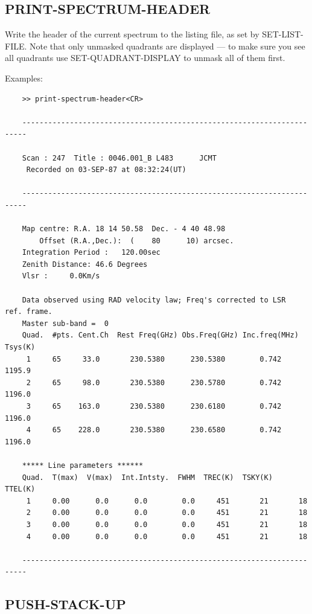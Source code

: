 \documentclass[11pt,twoside]{report}
\begin{document}
\subsection{PRINT-SPECTRUM-HEADER} 

Write the header of the current spectrum to the listing file, as set by
SET-LIST-FILE. Note that only unmasked quadrants are displayed --- to make
sure you see all quadrants use SET-QUADRANT-DISPLAY to unmask all of them
first.

Examples:
\begin{verbatim}
    >> print-spectrum-header<CR>

    -----------------------------------------------------------------------

    Scan : 247  Title : 0046.001_B L483      JCMT
     Recorded on 03-SEP-87 at 08:32:24(UT)

    -----------------------------------------------------------------------

    Map centre: R.A. 18 14 50.58  Dec. - 4 40 48.98
        Offset (R.A.,Dec.):  (    80      10) arcsec.
    Integration Period :   120.00sec
    Zenith Distance: 46.6 Degrees
    Vlsr :     0.0Km/s

    Data observed using RAD velocity law; Freq's corrected to LSR  ref. frame.
    Master sub-band =  0
    Quad.  #pts. Cent.Ch  Rest Freq(GHz) Obs.Freq(GHz) Inc.freq(MHz) Tsys(K)
     1     65     33.0       230.5380      230.5380        0.742    1195.9
     2     65     98.0       230.5380      230.5780        0.742    1196.0
     3     65    163.0       230.5380      230.6180        0.742    1196.0
     4     65    228.0       230.5380      230.6580        0.742    1196.0

    ***** Line parameters ******
    Quad.  T(max)  V(max)  Int.Intsty.  FWHM  TREC(K)  TSKY(K)  TTEL(K)
     1     0.00      0.0      0.0        0.0     451       21       18
     2     0.00      0.0      0.0        0.0     451       21       18
     3     0.00      0.0      0.0        0.0     451       21       18
     4     0.00      0.0      0.0        0.0     451       21       18

    -----------------------------------------------------------------------

\end{verbatim}

\subsection{PUSH-STACK-UP} 
\end{document}
